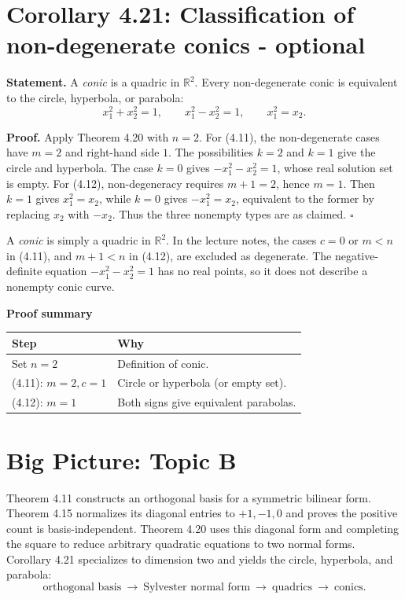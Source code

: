 \documentclass[11pt,a4paper]{article}
\newcommand{\prooftable}[1]{\medskip\textbf{Proof summary}\par\smallskip #1\medskip}
\begin{document}
\section{Corollary 4.21: Classification of non-degenerate conics - optional}
\textbf{Statement.} A \emph{conic} is a quadric in \(\mathbb R^2\).
Every non-degenerate conic is equivalent to the circle,
hyperbola, or parabola:
\[
x_1^2+x_2^2=1,\qquad x_1^2-x_2^2=1,\qquad x_1^2=x_2.
\]

\textbf{Proof.}
Apply Theorem 4.20 with \(n=2\).
For (4.11), the non-degenerate cases have \(m=2\) and right-hand side
\(1\). The possibilities \(k=2\) and \(k=1\) give the circle and
hyperbola. The case \(k=0\) gives
\(-x_1^2-x_2^2=1\), whose real solution set is empty.
For (4.12), non-degeneracy requires \(m+1=2\), hence \(m=1\).
Then \(k=1\) gives \(x_1^2=x_2\), while \(k=0\) gives
\(-x_1^2=x_2\), equivalent to the former by replacing \(x_2\)
with \(-x_2\). Thus the three nonempty types are as claimed. \(\square\)

\begin{personalnote}[title=Definitions for understanding]
A \emph{conic} is simply a quadric in \(\mathbb R^2\).
In the lecture notes, the cases \(c=0\) or \(m<n\) in (4.11),
and \(m+1<n\) in (4.12), are excluded as degenerate.
The negative-definite equation
\(-x_1^2-x_2^2=1\) has no real points, so it does not
describe a nonempty conic curve.
\end{personalnote}
\prooftable{\begin{tabularx}{\linewidth}{@{}p{.29\linewidth}X@{}}\hline
Step & Why\\\hline
Set \(n=2\) & Definition of conic.\\
(4.11): \(m=2,c=1\) & Circle or hyperbola (or empty set).\\
(4.12): \(m=1\) & Both signs give equivalent parabolas.\\\hline
\end{tabularx}}

\section*{Big Picture: Topic B}
Theorem 4.11 constructs an orthogonal basis for a symmetric bilinear form.
Theorem 4.15 normalizes its diagonal entries to \(+1,-1,0\)
and proves the positive count is basis-independent.
Theorem 4.20 uses this diagonal form and completing the square
to reduce arbitrary quadratic equations to two normal forms.
Corollary 4.21 specializes to dimension two and yields the
circle, hyperbola, and parabola:
\[
\boxed{\text{orthogonal basis}\ \longrightarrow\
\text{Sylvester normal form}\ \longrightarrow\
\text{quadrics}\ \longrightarrow\ \text{conics}.}
\]
\end{document}
